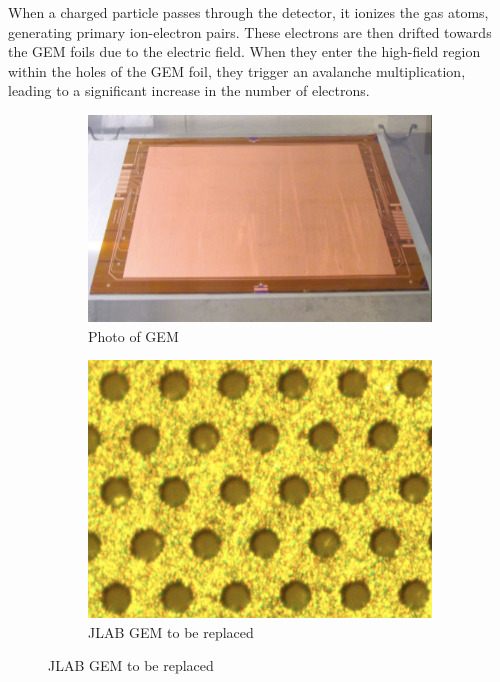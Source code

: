 When a charged particle passes through the detector, it ionizes the gas atoms, generating primary ion-electron pairs. These electrons are then drifted towards the GEM foils due to the electric field. When they enter the high-field region within the holes of the GEM foil, they trigger an avalanche multiplication, leading to a significant increase in the number of electrons.

\begin{figure}
     \centering
     \begin{subfigure}[b]{0.45\textwidth}
         \centering
         \includegraphics[width=\textwidth]{images/chap3/gem_foil_photo.png}
         \caption{Photo of GEM}
         \label{Photo of CEBAF}
     \end{subfigure}
     \hfill
     \begin{subfigure}[b]{0.45\textwidth}
         \centering
         \includegraphics[width=\textwidth]{images/chap3/gem_foil_micro.png}
         \caption{JLAB GEM to be replaced}
         \label{gem_structure}
     \end{subfigure}
\end{figure}

